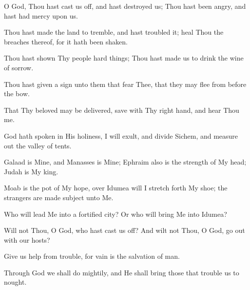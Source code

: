 O God, Thou hast cast us off, and hast destroyed us; Thou hast been angry, and hast had mercy upon us.

Thou hast made the land to tremble, and hast troubled it; heal Thou the breaches thereof, for it hath been shaken.

Thou hast shown Thy people hard things; Thou hast made us to drink the wine of sorrow.

Thou hast given a sign unto them that fear Thee, that they may flee from before the bow.

That Thy beloved may be delivered, save with Thy right hand, and hear Thou me.

God hath spoken in His holiness, I will exult, and divide Sichem, and measure out the valley of tents.

Galaad is Mine, and Manasses is Mine; Ephraim also is the strength of My head; Judah is My king.

Moab is the pot of My hope, over Idumea will I stretch forth My shoe; the strangers are made subject unto Me.

Who will lead Me into a fortified city? Or who will bring Me into Idumea?

Will not Thou, O God, who hast cast us off? And wilt not Thou, O God, go out with our hosts?

Give us help from trouble, for vain is the salvation of man.

Through God we shall do mightily, and He shall bring those that trouble us to nought.
